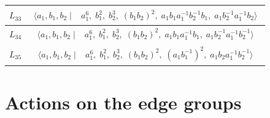 \documentclass[dvipsnames]{article}
\theoremstyle{definition}
\theoremstyle{remark}
\begin{document}
\begin{longtable}{ |c|c| }
    $L_{33}$
    &
    \begin{minipage}{6cm}
        {
        \vspace{-2.5mm}
        \begin{align*}
            \big \langle
            a_1, b_1, b_2 \; \big | \;&
            a_1^6, \;
            b_1^2, \;
            b_2^3, \;
            (b_1 b_2)^2, \;
            a_1 b_1 a_1^{-1} b_2^{-1} b_1, \;
            a_1 b_2^{-1} a_1^{-1} b_2
            \big \rangle
        \end{align*}
        \vspace{-5mm}
        }
    \end{minipage}\\
    \hline

    $L_{34}$
    &
    \begin{minipage}{6cm}
        {
        \vspace{-2.5mm}
        \begin{align*}
            \big \langle
            a_1, b_1, b_2 \; \big | \;&
            a_1^6, \;
            b_1^2, \;
            b_2^3, \;
            (b_1 b_2)^2, \;
            a_1 b_1 a_1^{-1} b_1, \;
            a_1 b_2^{-1} a_1^{-1} b_2^{-1}
            \big \rangle
        \end{align*}
        \vspace{-5mm}
        }
    \end{minipage}\\
    \hline

    $L_{35}$
    &
    \begin{minipage}{6cm}
        {
        \vspace{-2.5mm}
        \begin{align*}
            \big \langle
            a_1, b_1, b_2 \; \big | \;&
            a_1^6, \;
            b_1^2, \;
            b_2^3, \;
            (b_1 b_2)^2, \;
            (a_1 b_1^{-1})^2, \;
            a_1 b_2 a_1^{-1} b_2^{-1}
            \big \rangle
        \end{align*}
        \vspace{-5mm}
        }
    \end{minipage}\\
    \hline

    \end{longtable}



    \section{Actions on the edge groups}\label{app:more_data}    
\end{document}
